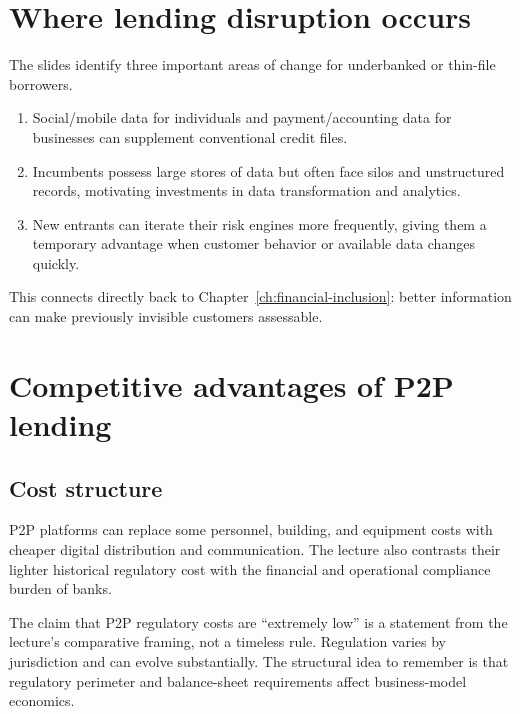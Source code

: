 \section{Where lending disruption occurs}

The slides identify three important areas of change for underbanked or thin-file borrowers.

\begin{enumerate}
  \item {} Social/mobile data for individuals and payment/accounting data for businesses can supplement conventional credit files.
  \item {} Incumbents possess large stores of data but often face silos and unstructured records, motivating investments in data transformation and analytics.
  \item {} New entrants can iterate their risk engines more frequently, giving them a temporary advantage when customer behavior or available data changes quickly.
\end{enumerate}

This connects directly back to Chapter~\ref{ch:financial-inclusion}: better information can make previously invisible customers assessable.

\section{Competitive advantages of P2P lending}

\subsection{Cost structure}

P2P platforms can replace some personnel, building, and equipment costs with cheaper digital distribution and communication. The lecture also contrasts their lighter historical regulatory cost with the financial and operational compliance burden of banks.

\begin{pitfall}
The claim that P2P regulatory costs are ``extremely low'' is a statement from the lecture's comparative framing, not a timeless rule. Regulation varies by jurisdiction and can evolve substantially. The structural idea to remember is that regulatory perimeter and balance-sheet requirements affect business-model economics.
\end{pitfall}

